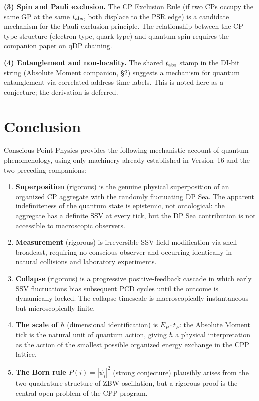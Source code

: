 \documentclass[12pt]{article}
\newcommand{\EP}{E_P}
\newcommand{\tP}{t_P}
\begin{document}
\textbf{(3) Spin and Pauli exclusion.}  The CP Exclusion Rule (if two CPs
occupy the same GP at the same $t_{\rm abs}$, both displace to the PSR edge)
is a candidate mechanism for the Pauli exclusion principle.  The relationship
between the CP type structure (electron-type, quark-type) and quantum spin
requires the companion paper on qDP chaining.

\textbf{(4) Entanglement and non-locality.}  The shared $t_{\rm abs}$ stamp
in the DI-bit string (Absolute Moment companion, \S 2) suggests a mechanism
for quantum entanglement via correlated address-time labels.  This is noted
here as a conjecture; the derivation is deferred.

\section{Conclusion}
\label{sec:conclusion}

Conscious Point Physics provides the following mechanistic account of quantum
phenomenology, using only machinery already established in Version~16 and the
two preceding companions:

\begin{enumerate}
  \item \textbf{Superposition} (rigorous) is the genuine physical
    superposition of an organized CP aggregate with the randomly fluctuating
    DP Sea.  The apparent indefiniteness of the quantum state is epistemic,
    not ontological: the aggregate has a definite SSV at every tick, but the
    DP Sea contribution is not accessible to macroscopic observers.

  \item \textbf{Measurement} (rigorous) is irreversible SSV-field
    modification via shell broadcast, requiring no conscious observer and
    occurring identically in natural collisions and laboratory experiments.

  \item \textbf{Collapse} (rigorous) is a progressive positive-feedback
    cascade in which early SSV fluctuations bias subsequent PCD cycles until
    the outcome is dynamically locked.  The collapse timescale is
    macroscopically instantaneous but microscopically finite.

  \item \textbf{The scale of $\hbar$} (dimensional identification) is
    $\EP\cdot\tP$: the Absolute Moment tick is the natural unit of quantum
    action, giving $\hbar$ a physical interpretation as the action of the
    smallest possible organized energy exchange in the CPP lattice.

  \item \textbf{The Born rule $P(i) = |\psi_i|^2$} (strong conjecture)
    plausibly arises from the two-quadrature structure of ZBW oscillation,
    but a rigorous proof is the central open problem of the CPP program.
\end{enumerate}
\end{document}
